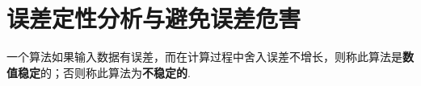 \documentclass[../../main.tex]{subfiles}
\begin{document}
\section{误差定性分析与避免误差危害}

\begin{definition}
一个算法如果输入数据有误差，而在计算过程中舍入误差不增长，则称此算法是\textbf{数值稳定}的；否则称此算法为\textbf{不稳定的}.
\end{definition}

\begin{example}

\end{example}
\begin{solution}

\end{solution}
\end{document}
